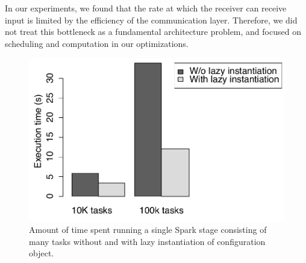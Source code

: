 In our experiments, we found that the rate at which the receiver can receive input is limited by the efficiency of the communication layer.
Therefore, we did not treat this bottleneck as a fundamental architecture problem, and focused on scheduling and computation in our optimizations.

\begin{figure}[t!]
 \begin{center}
   \includegraphics[scale=0.50]{images_graphs/optimizations/graph1/lazy_micro.pdf}
 \end{center}
 \caption{Amount of time spent running a single Spark stage consisting of many tasks without and with lazy instantiation of configuration object.}
 \label{fig:lazy_micro}
\end{figure}
